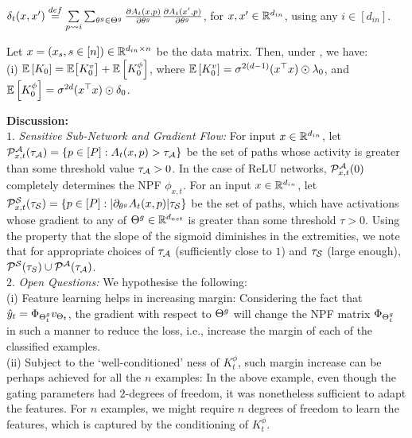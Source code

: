 \begin{definition}\label{def:delta}
$\delta_t(x,x')\stackrel{def}= \underset{{p\rsa i}}{\sum} \sum_{\tg\in\Tg}\frac{\partial A_{t}(x,p)}{\partial \tg} \frac{\partial A_{t}(x',p)}{\partial \tg}$, for $x,x'\in\R^{d_{in}}$, using any $i\in[d_{in}]$.
\end{definition}
\begin{theorem}\label{th:main} Let $x=(x_s,s\in[n])\in \R^{d_{in}\times n}$ be the data matrix. Then, under , we have:\\
(i) $\E{K_0}=\mathbb{E}\big[K^v_0\big]+\E{K^{\phi}_0}$, where $\E{K^{v}_0}=\sigma^{2(d-1)} (x^\top x)\odot \lambda_0$, and $\E{K^{\phi}_0}=\sigma^{2d}  (x^\top x)\odot \delta_0$.
\end{theorem}
\textbf{Discussion:}\\
$1.$ \emph{Sensitive Sub-Network and Gradient Flow:} For input $x\in\R^{d_{in}}$, let $\P^{\A}_{x,t}(\tau_{\A})=\{p\in[P]:A_t(x,p)>\tau_{\A}\}$ be the set of paths whose activity is greater than some threshold value $\tau_{\A}>0$. In the case of ReLU networks, $\P^{\A}_{x,t}(0)$ completely determines the NPF $\phi_{x,t}$. For an input $x\in\R^{d_{in}}$, let $\P^{\S}_{x,t}(\tau_{\S})=\{p\in[P]: |\partial_{\tg} A_t(x,p)|\tau_{\S}\}$ be the set of paths, which have activations whose gradient to any of $\Tg\inrdnet$ is greater than some threshold $\tau>0$. Using the property that the slope of the sigmoid diminishes in the extremities, we note that for appropriate choices of $\tau_{\A}$ (sufficiently close to $1$) and $\tau_{\S}$ (large enough), $\P^{\S}(\tau_{S})\cup \P^{\A}(\tau_{\A})$.\\
$2.$ \emph{Open Questions:} We hypothesise the following:\\
(i) Feature learning helps in increasing margin: Considering the fact that $\hat{y}_t=\Phi_{\Tg_t}v_{\Theta_t}$, the gradient with respect to $\Tg$ will change the NPF matrix $\Phi_{\Tg_t}$ in such a manner to reduce the loss, i.e., increase the margin of each of the classified examples. \\
(ii) Subject to the `well-conditioned' ness of $K^{\phi}_t$, such margin increase can be perhaps achieved for all the $n$ examples: In the above example, even though the gating parameters had $2$-degrees of freedom, it was nonetheless sufficient to adapt the features. For $n$ examples, we might require $n$ degrees of freedom to learn the features, which is captured by the conditioning of $K^{\phi}_t$.\\
